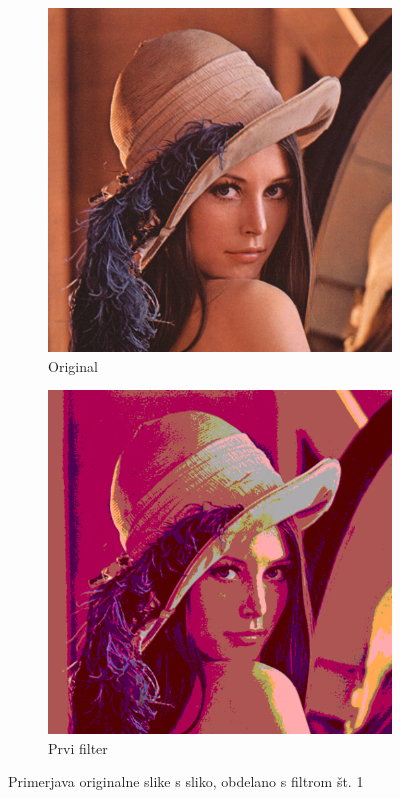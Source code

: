 \documentclass[a4paper, 12pt]{book}
\begin{document}
\begin{figure}[!ht]
    \centering
    \begin{subfigure}[b]{0.4\textwidth}
        \includegraphics[width=\textwidth]{lena}
        \caption{Original}
    \end{subfigure}
    \begin{subfigure}[b]{0.4\textwidth}
        \includegraphics[width=\textwidth]{lena_filter_1}
        \caption{Prvi filter}
    \end{subfigure}
    \caption{Primerjava originalne slike s sliko, obdelano s filtrom št. 1}
    \label{fig:lena_filter_1}
\end{figure}
\end{document}
